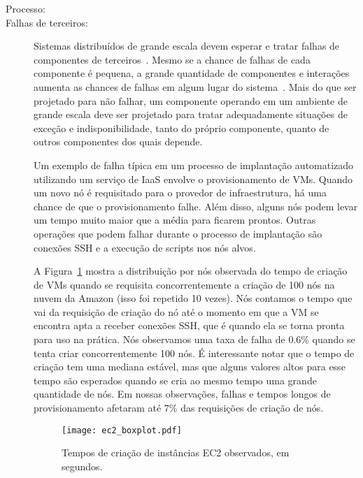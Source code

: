 \begin{description}

\item [Processo:]

\item [Falhas de terceiros:] 

Sistemas distribuídos de grande escala devem esperar e tratar falhas
de componentes de terceiros~\cite{Hamilton2007InternetScale,Helland2009Quicksand,CarnegieMellon2006ULS}.
Mesmo se a chance de falhas de cada componente é pequena,
a grande quantidade de componentes e interações aumenta as chances de 
falhas em algum lugar do sistema~\cite{CarnegieMellon2006ULS}.
Mais do que ser projetado para não falhar, um componente operando em um ambiente  de grande escala deve ser projetado para tratar adequadamente situações de exceção e indisponibilidade, tanto do próprio componente, quanto de outros componentes dos quais depende.

Um exemplo de falha típica em um processo de implantação automatizado
utilizando um serviço de IaaS envolve o provisionamento de VMs.
Quando um novo nó é requisitado para o provedor de infraestrutura,
há uma chance de que o provisionamento falhe.
Além disso, alguns nós podem levar um tempo muito maior que a média para ficarem prontos.
Outras operações que podem falhar durante o processo de implantação são
conexões SSH e a execução de scripts nos nós alvos.

A Figura~\ref{fig:ec2_boxplot} mostra a distribuição por nós observada
do tempo de criação de VMs quando se requisita concorrentemente a criação
de 100 nós na nuvem da Amazon (isso foi repetido 10 vezes).
Nós contamos o tempo que vai da requisição de criação do nó
até o momento em que a VM se encontra apta a receber conexões SSH,
que é quando ela se torna pronta para uso na prática.
Nós observamos uma taxa de falha de 0.6\%
quando se tenta criar concorrentemente 100 nós.
É interessante notar que o tempo de criação tem uma mediana estável,
mas que alguns valores altos para esse tempo são esperados quando
se cria ao mesmo tempo uma grande quantidade de nós.
Em nossas observações, falhas e tempos longos de provisionamento
afetaram até 7\% das requisições de criação de nós.

\begin{figure}[ht]
\centering
\texttt{[image: ec2\_boxplot.pdf]}
\caption{Tempos de criação de instâncias EC2 observados, em segundos.}
\label{fig:ec2_boxplot}
\end{figure}



\end{description}
